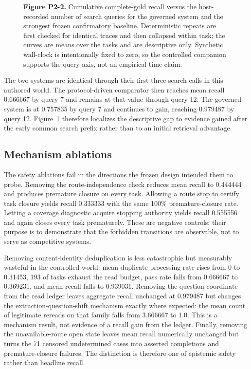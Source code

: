 \begin{figure}[t]
\centering

\caption{\textbf{Figure P2-2.} Cumulative complete-gold recall versus the
host-recorded number of search queries for the governed system and the strongest
frozen confirmatory baseline.  Deterministic repeats are first checked for identical
traces and then collapsed within task; the curves are means over the \OfflineTaskCount{} tasks
and are descriptive only.  Synthetic wall-clock is intentionally fixed to zero,
so the controlled companion supports the query axis, not an empirical-time
claim.}
\label{fig:p2-2}
\end{figure}

The two systems are identical through their first three search calls in this
authored world.  The protocol-driven comparator then reaches mean recall
0.666667 by query 7 and remains at that value through query 12.  The governed
system is at 0.757835 by query 7 and continues to gain, reaching 0.979487 by
query 12.
Figure~\ref{fig:p2-2} therefore localizes the descriptive gap to evidence gained
after the early common search prefix rather than to an initial retrieval
advantage.

\subsection{Mechanism ablations}
The safety ablations fail in the directions the frozen design intended them to
probe.  Removing the route-independence check reduces mean recall to 0.444444
and produces premature closure on every task.  Allowing a route stop to certify
task closure yields recall 0.333333 with the same 100\% premature-closure rate.
Letting a coverage diagnostic acquire stopping authority yields recall 0.555556
and again closes every task prematurely.  These are negative controls: their
purpose is to demonstrate that the forbidden transitions are observable, not to
serve as competitive systems.

Removing content-identity deduplication is less catastrophic but measurably
wasteful in the controlled world: mean duplicate-processing rate rises from 0
to 0.31453, 193 of \OfflineTaskCount{} tasks exhaust the read budget, pass rate falls from 0.666667
to 0.369231, and mean recall falls to 0.939031.  Removing the question coordinate
from the read ledger leaves aggregate recall unchanged at 0.979487 but changes
the extraction-question-shift mechanism exactly where expected: the mean count
of legitimate rereads on that family falls from 3.666667 to 1.0.  This is a mechanism
result, not evidence of a recall gain from the ledger.  Finally, removing the
unavailable-route open state leaves mean recall numerically unchanged but turns
the 71 censored undetermined cases into asserted completions and
premature-closure failures.  The distinction is therefore one of epistemic
safety rather than headline recall.

